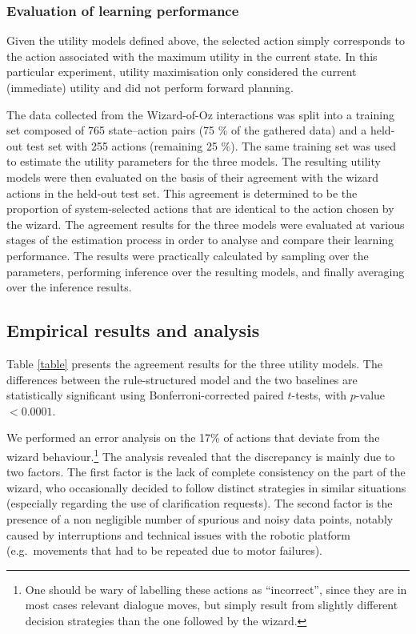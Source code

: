 \subsubsection*{Evaluation of learning performance}

Given the utility models defined above, the selected action simply corresponds to the action associated with the maximum utility in the current state. In this particular experiment, utility maximisation only considered the current (immediate) utility and did not perform forward planning.

The data collected from the Wizard-of-Oz interactions was split into a training set composed of 765 state--action pairs (75 \% of the gathered data) and a held-out test set with 255 actions (remaining 25 \%). The same training set was used to estimate the utility parameters for the three models.  The resulting utility models were then evaluated on the basis of their agreement with the wizard actions in the held-out test set. This agreement is determined to be the proportion of system-selected actions that are identical to the action chosen by the wizard. The agreement results for the three models were evaluated at various stages of the estimation process in order to analyse and compare their learning performance. The results were practically calculated by sampling over the parameters, performing inference over the resulting models, and finally averaging over the inference results.  

\subsection{Empirical results and analysis}
\label{sec:wozlearning-experiments-results}

Table \ref{table} presents the agreement results for the three utility models. The differences between the rule-structured model and the two baselines are statistically significant using Bonferroni-corrected paired $t$-tests, with $p$-value $< 0.0001$.   

We performed an error analysis on the 17\% of actions that deviate from the wizard behaviour.\footnote{One should be wary of labelling these actions as ``incorrect'', since they are in most cases relevant dialogue moves, but simply result from slightly different decision strategies than the one followed by the wizard.} The analysis revealed that the discrepancy is mainly due to two factors.  The first factor is the lack of complete consistency on the part of the wizard, who occasionally decided to follow distinct strategies in similar situations (especially regarding the use of clarification requests). The second factor is the presence of a non negligible number of spurious and noisy data points, notably caused by interruptions and technical issues with the robotic platform (e.g.\ movements that had to be repeated due to motor failures).

